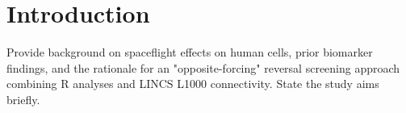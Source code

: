\section*{Introduction}

Provide background on spaceflight effects on human cells, prior biomarker findings, and the rationale for an "opposite-forcing" reversal screening approach combining R analyses and LINCS L1000 connectivity. State the study aims briefly.
